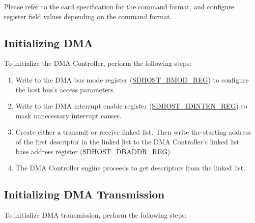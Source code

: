 \documentclass[main\_\_EN.tex]{subfiles}
\begin{document}
Please refer to the card specification for the command format, and configure register field values depending on the command format.

\subsection{Initializing DMA}\label{sec:sdhost-dma-init}

To initialize the DMA Controller, perform the following steps:

\begin{enumerate}
\item  Write to the DMA bus mode register (\hyperref[regdesc:SDHOSTBMODREG]{SDHOST\_BMOD\_REG}) to configure the host bus's access parameters. 
\item Write to the DMA interrupt enable register (\hyperref[regdesc:SDHOSTIDINTENREG]{SDHOST\_IDINTEN\_REG}) to mask unnecessary interrupt causes. 
\item Create either a transmit or receive linked list. Then write the starting address of the first descriptor in the linked list to the DMA Controller's linked list base address register (\hyperref[fielddesc:SDHOSTDBADDRREG]{\hyperref[regdesc:SDHOSTDBADDRREG]{SDHOST\_DBADDR\_REG}}). 
\item The DMA Controller engine proceeds to get descriptors from the linked list.
\end{enumerate}

\subsection{Initializing DMA Transmission}\label{sec:sdhost-dma-tx}

To initialize DMA transmission, perform the following steps:
\end{document}
